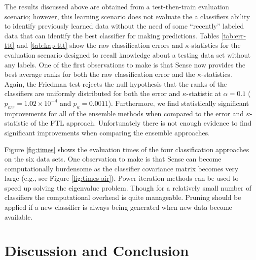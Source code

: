 \documentclass[10pt, conference]{IEEEtran}
\begin{document}
The results discussed above are obtained from a test-then-train evaluation scenario; however, this learning scenario does not evaluate the a classifiers ability  to identify previously learned data without the need of  some ``recently'' labeled data that can identify the best classifier for making predictions.  Tables \ref{tab:err-ttt} and \ref{tab:kap-ttt} show the raw classification errors and $\kappa$-statistics for the evaluation scenario designed to recall knowledge about a testing data set without any labels. One of the first observations to make is that Sense now provides the best average ranks for both the raw classification error and the $\kappa$-statistics. Again, the Friedman test rejects the null hypothesis that the ranks of the classifiers are uniformly distributed for both the error and $\kappa$-statistic at $\alpha=0.1$ ($p_{err} = 1.02 \times 10^{-4}$ and $p_{\kappa} = 0.0011$). Furthermore, we find statistically significant improvements for all of the ensemble methods when compared to the error and $\kappa$-statistic of the FTL approach. Unfortunately there is not enough evidence to find significant improvements when comparing the ensemble approaches. 


Figure \ref{fig:times} shows the evaluation times of the four classification approaches on the six data sets. One observation to make is that 
Sense can become computationally burdensome as the classifier covariance matrix becomes very large (e.g., see Figure \ref{fig:times air}). Power iteration methods can be used to speed up solving the eigenvalue problem. 
Though for a relatively small number of classifiers the computational overhead is quite manageable. 
Pruning should be applied if a new classifier is always being generated when new data become available. 




\section{Discussion and Conclusion}
\label{sec:conc}
\end{document}
